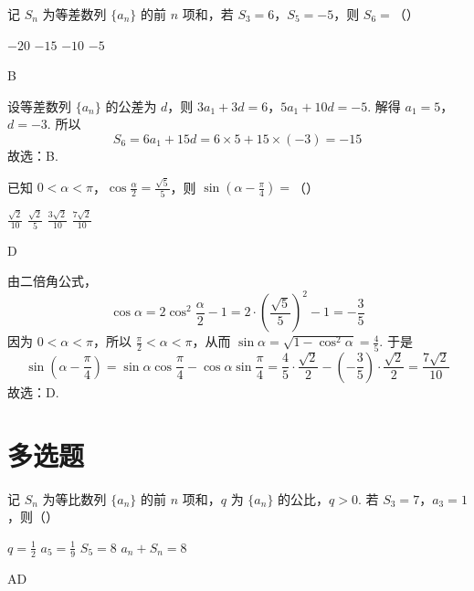 \documentclass[UTF8,a4paper,oneside,11pt]{ctexbook}
\begin{document}
\begin{problem}
记 \(S_n\) 为等差数列 \(\{a_n\}\) 的前 \(n\) 项和，若 \(S_3=6\)，\(S_5=-5\)，则 \(S_6=\)（\quad）

\choices
    {\(-20\)}
    {\(-15\)}
    {\(-10\)}
    {\(-5\)}
\end{problem}

\begin{answer}
B
\end{answer}

\begin{solution}
设等差数列 \(\{a_n\}\) 的公差为 \(d\)，则 \(3a_1+3d=6\)，\(5a_1+10d=-5\).
解得 \(a_1=5\)，\(d=-3\). 所以
\[
S_6=6a_1+15d=6\times 5+15\times(-3)=-15
\]
故选：B.
\end{solution}

\begin{problem}
已知 \(0<\alpha<\pi\)，\(\cos \frac{\alpha}{2}=\frac{\sqrt5}{5}\)，则 \(\sin\left(\alpha-\frac{\pi}{4}\right)=\)（\quad）

\choices
    {\(\frac{\sqrt2}{10}\)}
    {\(\frac{\sqrt2}{5}\)}
    {\(\frac{3\sqrt2}{10}\)}
    {\(\frac{7\sqrt2}{10}\)}
\end{problem}

\begin{answer}
D
\end{answer}

\begin{solution}
由二倍角公式，
\[
\cos\alpha=2\cos^2\frac{\alpha}{2}-1
=2\cdot\left(\frac{\sqrt5}{5}\right)^2-1
=-\frac35
\]
因为 \(0<\alpha<\pi\)，所以 \(\frac{\pi}{2}<\alpha<\pi\)，从而
\(\sin\alpha=\sqrt{1-\cos^2\alpha}=\frac45\).
于是
\[
\sin\left(\alpha-\frac{\pi}{4}\right)
=\sin\alpha\cos\frac{\pi}{4}-\cos\alpha\sin\frac{\pi}{4}
=\frac45\cdot\frac{\sqrt2}{2}-\left(-\frac35\right)\cdot\frac{\sqrt2}{2}
=\frac{7\sqrt2}{10}
\]
故选：D.
\end{solution}
\section{多选题}

\begin{problem}
记 \(S_n\) 为等比数列 \(\{a_n\}\) 的前 \(n\) 项和，\(q\) 为 \(\{a_n\}\) 的公比，\(q>0\). 若 \(S_3=7\)，\(a_3=1\)，则（\quad）

\choices
    {\(q=\frac12\)}
    {\(a_5=\frac19\)}
    {\(S_5=8\)}
    {\(a_n+S_n=8\)}
\end{problem}

\begin{answer}
AD
\end{answer}
\end{document}
